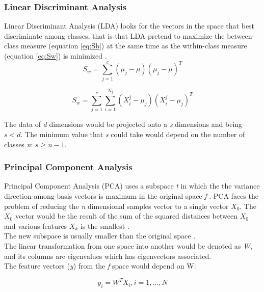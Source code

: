 \subsubsection{Linear Discriminant Analysis}
Linear Discriminant Analysis (LDA) looks for the vectors in the space that best discriminate among classes, that is that LDA pretend to maximize the between-class measure (equation \ref{eq:Sb}) at the same time as the within-class measure (equation \ref{eq:Sw}) is minimized \cite{PCAvsLDA}.\\

\begin{equation}
S_w = \sum^c_{j=1}(\mu _j - \mu)(\mu _j - \mu)^T
\end{equation}\label{eq:Sb}

\begin{equation}
S_w = \sum^c_{j=1}\sum^{N_j}_{i=1}(X_i^j - \mu _j)(X_i^j - \mu _j)^T
\end{equation}\label{eq:Sw}

The data of \textit{d} dimensions would be projected onto a \textit{s} dimensions and being $s < d$. The minimum value that \textit{s} could take would depend on the number of classes \textit{n}: $s \geq n-1$.


\subsubsection{Principal Component Analysis}
Principal Component Analysis (PCA) uses a subspace \textit{t} in which the the variance direction among basis vectors is maximum in the original space \textit{f} \cite{PCAvsLDA}. PCA faces the problem of reducing the \textit{n} dimensional samples vector to a single vector $X_0$. The $X_0$ vector would be the result of the sum of the squared distances between $X_0$ and various features $X_k$ is the smallest \cite{Duda}.\\

The new subspace is usually smaller than the original space \cite{PCAvsLDA}.\\

The linear transformation from one space into another would be denoted as \textit{W}, and its columns are eigenvalues which has eigenvectors associated.\\

The feature vectors (\textit{y}) from the \textit{f} space would depend on W:

\begin{equation}
y_{i} = W^TX_{i}, i=1,...,N
\end{equation}

